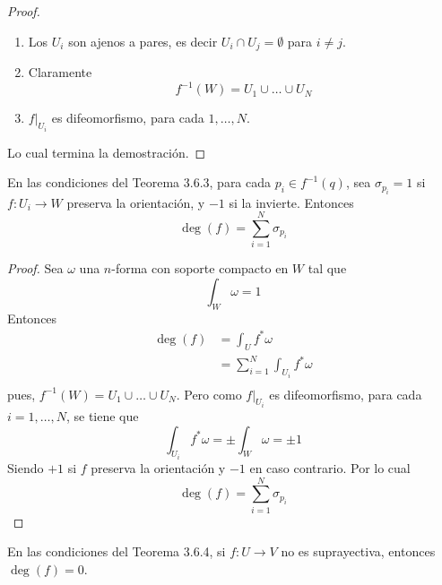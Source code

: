 \documentclass[12pt]{report}
\theoremstyle{largebreak}
\newcommand\cf[3]{\ensuremath{#1:#2\rightarrow#3}}
\begin{document}
\begin{proof}
    \begin{enumerate}
        \item Los $U_i$ son ajenos a pares, es decir $U_i\cap U_j=\emptyset$ para $i\neq j$.
        \item Claramente
        \begin{equation*}
            f^{-1}(W)=U_1\cup\dots\cup U_N
        \end{equation*}
        \item $f|_{U_i}$ es difeomorfismo, para cada $1,\dots,N$.
    \end{enumerate}
    
    Lo cual termina la demostración.
\end{proof}

\begin{theor}
    En las condiciones del Teorema 3.6.3, para cada $p_i\in f^{-1}(q)$, sea $\sigma_{p_i}=1$ si $\cf{f}{U_i}{W}$ preserva la orientación, y $-1$ si la invierte. Entonces
    \begin{equation*}
        \deg(f)=\sum_{i=1}^{N}\sigma_{p_i}
    \end{equation*}
\end{theor}

\begin{proof}
    Sea $\omega$ una $n$-forma con soporte compacto en $W$ tal que
    \begin{equation*}
        \int_{W}\omega = 1
    \end{equation*}
    Entonces
    \begin{equation*}
        \begin{split}
            \deg(f)&=\int_{U}f^*\omega\\
            &=\sum_{i=1}^{N}\int_{U_i}f^*\omega\\
        \end{split}
    \end{equation*}
    pues, $f^{-1}(W)=U_1\cup\dots\cup U_N$. Pero como $f|_{U_i}$ es difeomorfismo, para cada $i=1,\dots,N$, se tiene que
    \begin{equation*}
        \int_{U_i}f^*\omega=\pm \int_{W}\omega=\pm 1
    \end{equation*}
    Siendo $+1$ si $f$ preserva la orientación y $-1$ en caso contrario. Por lo cual
    \begin{equation*}
        \deg(f)=\sum_{i=1}^{N}\sigma_{p_i}
    \end{equation*}
\end{proof}

\begin{theor}
    En las condiciones del Teorema 3.6.4, si $\cf{f}{U}{V}$ no es suprayectiva, entonces $\deg(f)=0$.
\end{theor}
\end{document}

